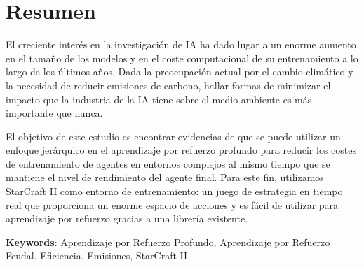 \chapter*{Resumen}

El creciente interés en la investigación de IA ha dado lugar a un enorme aumento en el tamaño de los modelos y en el coste computacional de su entrenamiento a lo largo de los últimos años. Dada la preocupación actual por el cambio climático y la necesidad de reducir emisiones de carbono, hallar formas de minimizar el impacto que la industria de la IA tiene sobre el medio ambiente es más importante que nunca.

El objetivo de este estudio es encontrar evidencias de que se puede utilizar un enfoque jerárquico en el aprendizaje por refuerzo profundo para reducir los costes de entrenamiento de agentes en entornos complejos al mismo tiempo que se mantiene el nivel de rendimiento del agente final. Para este fin, utilizamos StarCraft II como entorno de entrenamiento: un juego de estrategia en tiempo real que proporciona un enorme espacio de acciones y es fácil de utilizar para aprendizaje por refuerzo gracias a una librería existente.

\vspace{1.5cm}

\textbf{Keywords}: Aprendizaje por Refuerzo Profundo, Aprendizaje por Refuerzo Feudal, Eficiencia, Emisiones, StarCraft II
